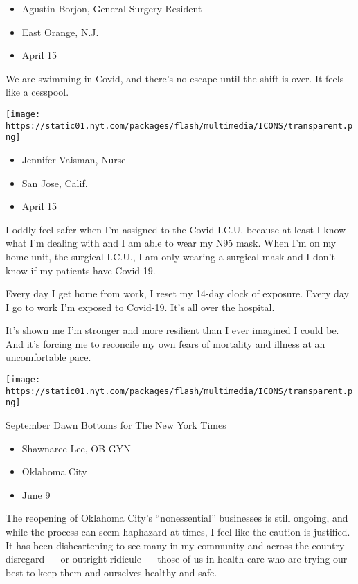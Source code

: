 \begin{itemize}
\tightlist
\item
  Agustin Borjon, General Surgery Resident
\item
  East Orange, N.J.
\item
  April 15
\end{itemize}

We are swimming in Covid, and there's no escape until the shift is over.
It feels like a cesspool.

\texttt{[image: https://static01.nyt.com/packages/flash/multimedia/ICONS/transparent.png]}

\begin{itemize}
\tightlist
\item
  Jennifer Vaisman, Nurse
\item
  San Jose, Calif.
\item
  April 15
\end{itemize}

I oddly feel safer when I'm assigned to the Covid I.C.U. because at
least I know what I'm dealing with and I am able to wear my N95 mask.
When I'm on my home unit, the surgical I.C.U., I am only wearing a
surgical mask and I don't know if my patients have Covid-19.

Every day I get home from work, I reset my 14-day clock of exposure.
Every day I go to work I'm exposed to Covid-19. It's all over the
hospital.

It's shown me I'm stronger and more resilient than I ever imagined I
could be. And it's forcing me to reconcile my own fears of mortality and
illness at an uncomfortable pace.

\texttt{[image: https://static01.nyt.com/packages/flash/multimedia/ICONS/transparent.png]}

September Dawn Bottoms for The New York Times

\begin{itemize}
\tightlist
\item
  Shawnaree Lee, OB-GYN
\item
  Oklahoma City
\item
  June 9
\end{itemize}

The reopening of Oklahoma City's ``nonessential'' businesses is still
ongoing, and while the process can seem haphazard at times, I feel like
the caution is justified. It has been disheartening to see many in my
community and across the country disregard --- or outright ridicule ---
those of us in health care who are trying our best to keep them and
ourselves healthy and safe.

